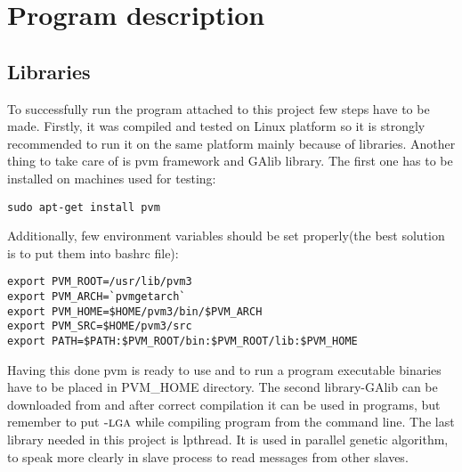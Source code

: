\appendix
\makeatletter
\def\Pref@section{Appendix~}
\def\@seccntformat#1{\csname Pref@#1\endcsname \csname the#1\endcsname\quad}
\makeatother

\section{Program description}
\label{Appendix}
\subsection{Libraries}
To successfully run the program attached to this project few steps have to be
made. Firstly, it was compiled and tested on Linux platform so it is strongly
recommended to run it on the same platform mainly because of libraries.  Another
thing to take care of is pvm framework and GAlib library. The first one has to
be installed on machines used for testing:
\begin{verbatim}
sudo apt-get install pvm
\end{verbatim}
Additionally, few environment variables should be set properly(the best solution
is to put them into bashrc file):
\begin{verbatim}
export PVM_ROOT=/usr/lib/pvm3
export PVM_ARCH=`pvmgetarch`
export PVM_HOME=$HOME/pvm3/bin/$PVM_ARCH
export PVM_SRC=$HOME/pvm3/src
export PATH=$PATH:$PVM_ROOT/bin:$PVM_ROOT/lib:$PVM_HOME
\end{verbatim}
Having this done pvm is ready to use and to run a program executable binaries have
to be placed in PVM\_HOME directory. The second library-GAlib can be downloaded from
 and after correct compilation it can
be used in programs, but remember to put $\textsc{-lga}$ while compiling program
from the command line. The last library needed in this project is lpthread. It
is used in parallel genetic algorithm, to speak more clearly in slave process to
read messages from other slaves. 
